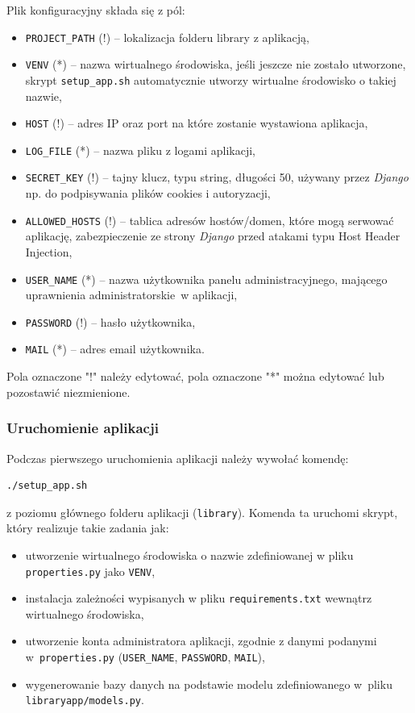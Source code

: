 \documentclass[twoside]{projektInzynierskiMS}
\begin{document}
Plik konfiguracyjny składa się z pól:
\begin{itemize}
	\item \verb`PROJECT_PATH` (!) -- lokalizacja folderu library z aplikacją,
	\item \verb`VENV` (*) -- nazwa wirtualnego środowiska, jeśli jeszcze nie zostało utworzone, skrypt \verb`setup_app.sh` automatycznie utworzy wirtualne środowisko o takiej nazwie,
	\item \verb`HOST` (!) -- adres IP oraz port na które zostanie wystawiona aplikacja,
	\item \verb`LOG_FILE` (*) -- nazwa pliku z logami aplikacji,
	\item \verb`SECRET_KEY` (!) -- tajny klucz, typu string, długości 50, używany przez \textit{Django} np. do podpisywania plików cookies i autoryzacji,
	\item \verb`ALLOWED_HOSTS` (!) -- tablica adresów hostów/domen, które mogą serwować aplikację, zabezpieczenie ze strony \textit{Django} przed atakami typu Host Header Injection,
	\item \verb`USER_NAME` (*) -- nazwa użytkownika panelu administracyjnego, mającego uprawnienia administratorskie~w aplikacji,
	\item \verb`PASSWORD` (!) -- hasło użytkownika,
	\item \verb`MAIL` (*) -- adres email użytkownika.
\end{itemize}

Pola oznaczone "!" należy edytować, pola oznaczone "*" można edytować lub pozostawić niezmienione.

\subsubsection{Uruchomienie aplikacji}
Podczas pierwszego uruchomienia aplikacji należy wywołać komendę:
\begin{verbatim}
./setup_app.sh
\end{verbatim}
z poziomu głównego folderu aplikacji (\verb`library`). Komenda ta uruchomi skrypt, który realizuje takie zadania jak:
\begin{itemize}
	\item utworzenie wirtualnego środowiska o nazwie zdefiniowanej w pliku \verb`properties.py` jako \verb`VENV`,
	\item instalacja zależności wypisanych w pliku \verb`requirements.txt` wewnątrz wirtualnego środowiska,
	\item utworzenie konta administratora aplikacji, zgodnie z danymi podanymi w~\verb`properties.py` (\verb`USER_NAME`, \verb`PASSWORD`, \verb`MAIL`),
	\item wygenerowanie bazy danych na podstawie modelu zdefiniowanego w~pliku \verb`libraryapp/models.py`.
\end{itemize}
\end{document}
